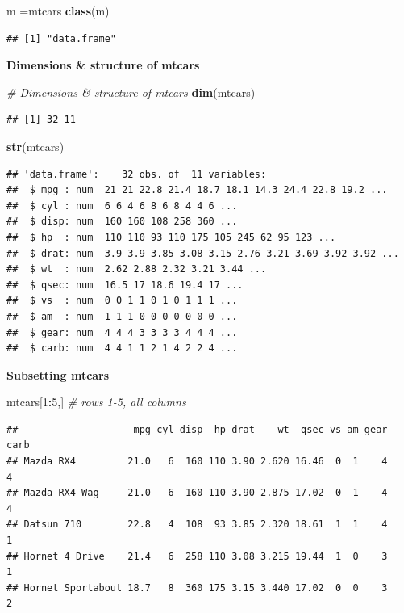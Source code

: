 \documentclass[
]{article}
\newenvironment{Shaded}{\begin{snugshade}}{\end{snugshade}}
\newcommand{\CommentTok}[1]{\textcolor[rgb]{0.56,0.35,0.01}{\textit{#1}}}
\newcommand{\DecValTok}[1]{\textcolor[rgb]{0.00,0.00,0.81}{#1}}
\newcommand{\KeywordTok}[1]{\textcolor[rgb]{0.13,0.29,0.53}{\textbf{#1}}}
\newcommand{\NormalTok}[1]{#1}
\newcommand{\OperatorTok}[1]{\textcolor[rgb]{0.81,0.36,0.00}{\textbf{#1}}}
\begin{document}
\begin{Shaded}
\begin{Highlighting}[]
\NormalTok{m =mtcars}
\KeywordTok{class}\NormalTok{(m)}
\end{Highlighting}
\end{Shaded}

\begin{verbatim}
## [1] "data.frame"
\end{verbatim}

\textbf{Dimensions \& structure of mtcars}

\begin{Shaded}
\begin{Highlighting}[]
\CommentTok{# Dimensions & structure of mtcars}
\KeywordTok{dim}\NormalTok{(mtcars)  }
\end{Highlighting}
\end{Shaded}

\begin{verbatim}
## [1] 32 11
\end{verbatim}

\begin{Shaded}
\begin{Highlighting}[]
\KeywordTok{str}\NormalTok{(mtcars)  }
\end{Highlighting}
\end{Shaded}

\begin{verbatim}
## 'data.frame':    32 obs. of  11 variables:
##  $ mpg : num  21 21 22.8 21.4 18.7 18.1 14.3 24.4 22.8 19.2 ...
##  $ cyl : num  6 6 4 6 8 6 8 4 4 6 ...
##  $ disp: num  160 160 108 258 360 ...
##  $ hp  : num  110 110 93 110 175 105 245 62 95 123 ...
##  $ drat: num  3.9 3.9 3.85 3.08 3.15 2.76 3.21 3.69 3.92 3.92 ...
##  $ wt  : num  2.62 2.88 2.32 3.21 3.44 ...
##  $ qsec: num  16.5 17 18.6 19.4 17 ...
##  $ vs  : num  0 0 1 1 0 1 0 1 1 1 ...
##  $ am  : num  1 1 1 0 0 0 0 0 0 0 ...
##  $ gear: num  4 4 4 3 3 3 3 4 4 4 ...
##  $ carb: num  4 4 1 1 2 1 4 2 2 4 ...
\end{verbatim}

\textbf{Subsetting mtcars}

\begin{Shaded}
\begin{Highlighting}[]
\NormalTok{mtcars[}\DecValTok{1}\OperatorTok{:}\DecValTok{5}\NormalTok{,] }\CommentTok{# rows 1-5, all columns}
\end{Highlighting}
\end{Shaded}

\begin{verbatim}
##                    mpg cyl disp  hp drat    wt  qsec vs am gear carb
## Mazda RX4         21.0   6  160 110 3.90 2.620 16.46  0  1    4    4
## Mazda RX4 Wag     21.0   6  160 110 3.90 2.875 17.02  0  1    4    4
## Datsun 710        22.8   4  108  93 3.85 2.320 18.61  1  1    4    1
## Hornet 4 Drive    21.4   6  258 110 3.08 3.215 19.44  1  0    3    1
## Hornet Sportabout 18.7   8  360 175 3.15 3.440 17.02  0  0    3    2
\end{verbatim}
\end{document}
